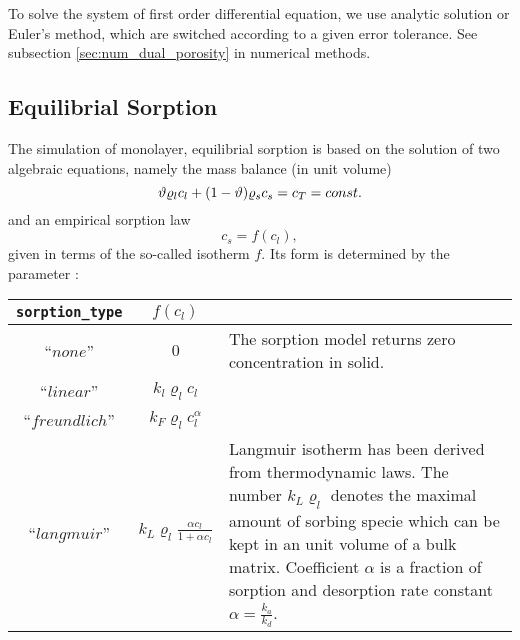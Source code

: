 To solve the system of first order differential equation, we use analytic solution or Euler's method,
which are switched according to a given error tolerance. See subsection \ref{sec:num_dual_porosity} 
in numerical methods.
 

\subsection{Equilibrial Sorption}
\label{sec:sorp_math}

The simulation of monolayer, equilibrial sorption is based on the solution of two algebraic equations, namely the mass balance (in unit volume)
\begin{equation}
\label{eq:mass_balance_sorption}
\th \varrho_l c_l + (1-\th) \varrho_s c_s = c_T = const.
\end{equation}
and an empirical sorption law
\begin{equation}
\label{eq:relation_cs_cl}
c_s = f(c_l),
\end{equation}
given in terms of the so-called isotherm $f$.
Its form is determined by the parameter :
\begin{center}
\def\arraystretch{2}
\begin{tabular}{|c|c|p{8cm}|}
\hline
\texttt{sorption\_type} & $f(c_l)$ & \\\hline
``$none$'' & $0$ & The sorption model returns zero concentration in solid.\\\hline
``$linear$'' & $k_l\varrho_l c_l$ &\\\hline
``$freundlich$'' & $k_F \varrho_l c_l^{\alpha}$ &\\\hline
``$langmuir$'' & $k_L \varrho_l \frac{\alpha c_l}{1 + \alpha c_l}$ &
       Langmuir isotherm has been derived from thermodynamic laws. The number $k_L\varrho_l$ denotes the maximal amount 
       of sorbing specie which can be kept in an unit volume of a bulk matrix. Coefficient $\alpha$ is 
       a fraction of sorption and desorption rate constant $\alpha = \frac{k_a}{k_d}$.\\\hline
\end{tabular}
\end{center}

